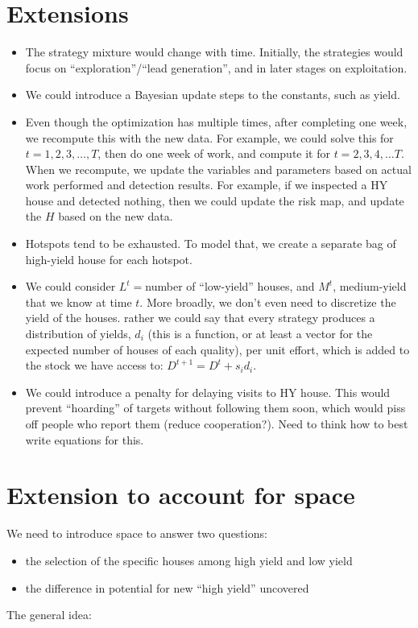 \documentclass[english]{paper}
\begin{document}
\section{Extensions}
\begin{itemize}
\item The strategy mixture would change with time. Initially, the strategies
would focus on ``exploration''/``lead generation'', and in later
stages on exploitation.
\item We could introduce a Bayesian update steps to the constants, such
as yield.
\item Even though the optimization has multiple times, after completing
one week, we recompute this with the new data. For example, we could
solve this for $t=1,2,3,\dots,T$, then do one week of work, and compute
it for $t=2,3,4,\dots T$. When we recompute, we update the variables
and parameters based on actual work performed and detection results.
For example, if we inspected a HY house and detected nothing, then
we could update the risk map, and update the $H$ based on the new
data.
\item Hotspots tend to be exhausted. To model that, we create a separate
bag of high-yield house for each hotspot.
\item We could consider $L^{t}=$number of ``low-yield'' houses, and $M^{t}$,
medium-yield that we know at time $t$. More broadly, we don't even
need to discretize the yield of the houses. rather we could say that
every strategy produces a distribution of yields, $d_{i}$ (this is
a function, or at least a vector for the expected number of houses
of each quality), per unit effort, which is added to the stock we
have access to: $D^{t+1}=D^{t}+s_{i}d_{i}$.
\item We could introduce a penalty for delaying visits to HY house. This
would prevent ``hoarding'' of targets without following them soon,
which would piss off people who report them (reduce cooperation?).
Need to think how to best write equations for this.
\end{itemize}

\section{Extension to account for space}

We need to introduce space to answer two questions:
\begin{itemize}
\item the selection of the specific houses among high yield and low yield
\item the difference in potential for new ``high yield'' uncovered 
\end{itemize}
The general idea: 



\end{document}
